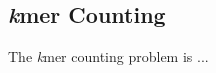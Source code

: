 \subsection{\textit{k}mer Counting} \label{background:kmer_counting}
The \textit{k}mer counting problem is ...
